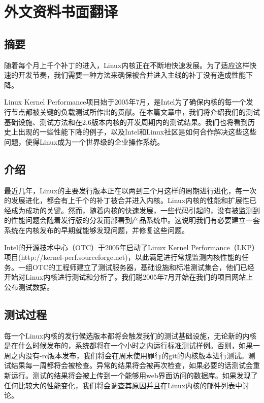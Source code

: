 

\chapter{外文资料书面翻译}
{
\begin{center}
\end{center}
}

\section*{摘要}
随着每个月上千个补丁的进入，Linux内核正在不断地快速发展。为了适应这样快速的开发节奏，我们需要一种方法来确保被合并进入主线的补丁没有造成性能下降。

Linux Kernel Performance项目始于2005年7月，是Intel为了确保内核的每一个发行节点都被关键的负载测试所作出的贡献。在本篇文章中，我们将介绍我们的测试基础设施、测试方法和在2.6版本内核的开发周期内的测试结果。我们也将看到历史上出现的一些性能下降的例子，以及Intel和Linux社区是如何合作解决这些这些问题，使得Linux成为一个世界级的企业操作系统。
\section{介绍}
最近几年，Linux的主要发行版本正在以两到三个月这样的周期进行进化，每一次的发展进化，都会有上千个的补丁被合并进入内核。Linux内核的性能和扩展性已经成为成功的关键。然而，随着内核的快速发展，一些代码引起的，没有被监测到的性能问题会随着发行版的分发而部署到产品系统中。这说明我们有必要建立一套系统在内核发布的早期就能够发现问题，并修复这些问题。

Intel的开源技术中心（OTC）于2005年启动了Linux Kernel Performance（LKP）项目(http://kernel-perf.sourceforge.net)，以此满足进行常规监测内核性能的任务。一组OTC的工程师建立了测试服务器，基础设施和标准测试集合，他们已经开始对Linux内核进行测试和分析了。我们聪2005年7月开始在我们的项目网站上公布测试数据。
\section{测试过程}
每一个Linux内核的发行候选版本都将会触发我们的测试基础设施，无论新的内核是在什么时候发布的，系统都将在一个小时之内运行标准测试样例。否则，如果一周之内没有-rc版本发布，我们将会在周末使用罪行的git的内核版本进行测试。测试结果每一周都将会被检查。异常的结果将会被再次检查，如果必要的话测试会重新运行。测试的结果将会被上传到一个能够用web界面访问的数据库。如果发现了任何比较大的性能变化，我们将会调查其原因并且在Linux内核的邮件列表中讨论。


